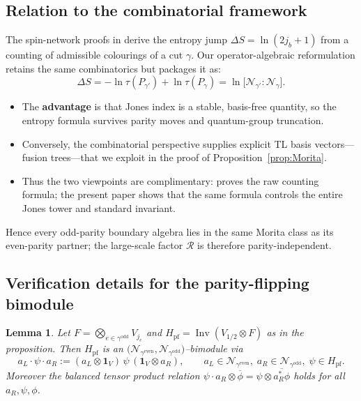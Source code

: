 \documentclass[11pt]{article}
\newtheorem{lemma}{Lemma}[section]
\begin{document}
\subsection*{Relation to the combinatorial framework \cite{BridgeMono,EntropyMono}}
The spin-network proofs in \cite{BridgeMono,EntropyMono} derive the entropy
jump
$\Delta S=\ln(2j_b+1)$
from a counting of admissible colourings of a cut $\gamma$.
Our operator-algebraic reformulation retains the same combinatorics but
packages it as:
\[
  \Delta S
  =-\ln\tau(P_{\gamma'})
  +\ln\tau(P_{\gamma})
  =\ln\bigl[\mathcal N_{\gamma'}:\mathcal N_{\gamma}\bigr].
\]
\begin{itemize}
  \item The {\bf advantage} is that Jones index is a stable, basis-free
    quantity, so the entropy formula survives parity moves and quantum-group
    truncation.
  \item Conversely, the combinatorial perspective supplies explicit
    TL basis vectors—fusion trees—that we exploit in the proof of
    Proposition~\ref{prop:Morita}.
  \item Thus the two viewpoints are complimentary: \cite{BridgeMono,EntropyMono}
    proves the raw counting formula; the present paper shows that the
    same formula controls the entire Jones tower and standard invariant.
\end{itemize}

Hence every odd-parity boundary algebra lies in the same Morita class as its
even-parity partner; the large-scale factor $\mathcal R$ is therefore
parity-independent.

\subsection*{Verification details for the parity-flipping bimodule}

\begin{lemma}\label{lem:bimodule-structure}
  Let $F=\bigotimes_{e\in\gamma^{\mathrm{odd}}}V_{j_e}$ and
  $H_{\mathrm{pf}}=\operatorname{Inv}(V_{1/2}\otimes F)$ as in the
  proposition.
  Then $H_{\mathrm{pf}}$ is an
  $\bigl(\mathcal N_{\gamma^{\mathrm{even}}},
  \mathcal N_{\gamma^{\mathrm{odd}}}\bigr)$–bimodule via
  \[
    a_L\cdot\psi\cdot a_R
    :=(a_L\otimes\mathbf1_V)\,\psi\,(\mathbf1_V\otimes a_R),
    \qquad
    a_L\in\mathcal N_{\gamma^{\mathrm{even}}},
    \;a_R\in\mathcal N_{\gamma^{\mathrm{odd}}},
    \;\psi\in H_{\mathrm{pf}}.
  \]
  Moreover the balanced tensor product relation
  $\psi\cdot a_R\otimes\overline\phi
  =\psi\otimes\overline{a_R^{*}\phi}$
  holds for all $a_R,\psi,\phi$.
\end{lemma}
\end{document}

